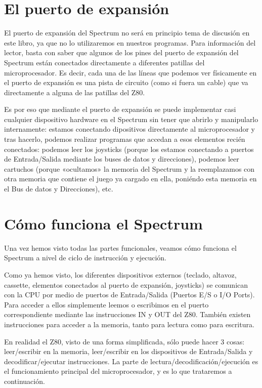 \documentclass[letterpaper,10pt,spanish]{sphinxmanual}
\begin{document}
\section{El puerto de expansión}
\label{\detokenize{03_arquitectura/arquitectura:el-puerto-de-expansion}}
El puerto de expansión del Spectrum no será en principio tema de discusión en este libro, ya que no lo utilizaremos en nuestros programas. Para información del lector, basta con saber que algunos de los pines del puerto de expansión del Spectrum están conectados directamente a diferentes patillas del microprocesador. Es decir, cada una de las líneas que podemos ver físicamente en el puerto de expansión es una pista de circuito (como si fuera un cable) que va directamente a alguna de las patillas del Z80.

Es por eso que mediante el puerto de expansión se puede implementar casi cualquier dispositivo hardware en el Spectrum sin tener que abrirlo y manipularlo internamente: estamos conectando dipositivos directamente al microprocesador y tras hacerlo, podemos realizar programas que accedan a esos elementos recién conectados: podemos leer los joysticks (porque los estamos conectando a puertos de Entrada/Salida mediante los buses de datos y direcciones), podemos leer cartuchos (porque «ocultamos» la memoria del Spectrum y la reemplazamos con otra memoria que contiene el juego ya cargado en ella, poniéndo esta memoria en el Bus de datos y Direcciones), etc.


\section{Cómo funciona el Spectrum}
\label{\detokenize{03_arquitectura/arquitectura:como-funciona-el-spectrum}}
Una vez hemos visto todas las partes funcionales, veamos cómo funciona el Spectrum a nivel de ciclo de instrucción y ejecución.

Como ya hemos visto, los diferentes dispositivos externos (teclado, altavoz, cassette, elementos conectados al puerto de expansión, joysticks) se comunican con la CPU por medio de puertos de Entrada/Salida (Puertos E/S o I/O Ports). Para acceder a ellos simplemente leemos o escribimos en el puerto correspondiente mediante las instrucciones IN y OUT del Z80. También existen instrucciones para acceder a la memoria, tanto para lectura como para escritura.

En realidad el Z80, visto de una forma simplificada, sólo puede hacer 3 cosas: leer/escribir en la memoria, leer/escribir en los dispositivos de Entrada/Salida y decodificar/ejecutar instrucciones. La parte de lectura/decodificación/ejecución es el funcionamiento principal del microprocesador, y es lo que trataremos a continuación.
\end{document}
